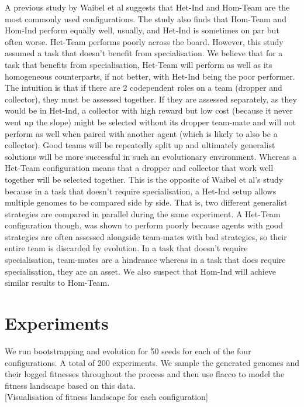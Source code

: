 \documentclass[12pt]{article}  %
\begin{document}
A previous study by Waibel et al suggests that Het-Ind and Hom-Team are the most commonly used configurations.
The study also finds that Hom-Team and Hom-Ind perform equally well, usually, and Het-Ind is sometimes on par but often worse. 
Het-Team performs poorly across the board.
However, this study assumed a task that doesn’t benefit from specialisation. 
We believe that for a task that benefits from specialisation, Het-Team will perform as well as its homogeneous counterparts, if not better, with Het-Ind being the poor performer.
The intuition is that if there are 2 codependent roles on a team (dropper and collector), they must be assessed together. 
If they are assessed separately, as they would be in Het-Ind, a collector with high reward but low cost (because it never went up the slope) might be selected without its dropper team-mate and will not perform as well when paired with another agent (which is likely to also be a collector).
Good teams will be repeatedly split up and ultimately generalist solutions will be more successful in such an evolutionary environment.
Whereas a Het-Team configuration means that a dropper and collector that work well together will be selected together.
This is the opposite of Waibel et al's study because in a task that doesn't require specialisation, a Het-Ind setup allows multiple genomes to be compared side by side.
That is, two different generalist strategies are compared in parallel during the same experiment.
A Het-Team configuration though, was shown to perform poorly because agents with good strategies are often assessed alongside team-mates with bad strategies, so their entire team is discarded by evolution.
In a task that doesn't require specialisation, team-mates are a hindrance whereas in a task that does require specialisation, they are an asset.
We also suspect that Hom-Ind will achieve similar results to Hom-Team.

\section{Experiments}

We run bootstrapping and evolution for 50 seeds for each of the four configurations. A total of 200 experiments. 
We sample the generated genomes and their logged fitnesses throughout the process and then use flacco to model the fitness landscape based on this data.\\

[Visualisation of fitness landscape for each configuration]
\end{document}

